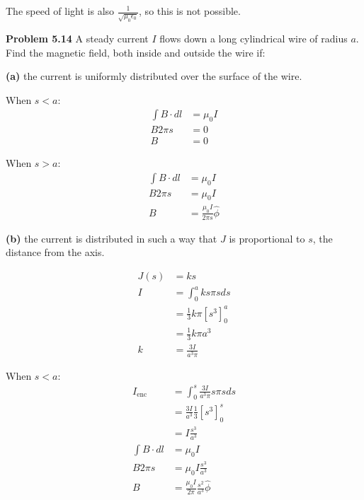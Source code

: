 \documentclass{article}
\begin{document}
The speed of light is also $\frac{1}{\sqrt{\mu_0 \epsilon_0}}$, so this is not possible. 

\textbf{Problem 5.14}
A steady current $I$ flows down a long cylindrical wire of radius $a$.
Find the magnetic field, both inside and outside the wire if:

\textbf{(a)}
the current is uniformly distributed over the surface of the wire.

When $s < a$:
\begin{equation*}
\begin{split}
	\int B \cdot dl & = \mu_0 I \\
	B 2 \pi s & = 0 \\
	B & = \boxed{0}
\end{split}
\end{equation*}

When $s > a$:
\begin{equation*}
\begin{split}
	\int B \cdot dl & = \mu_0 I \\
	B 2 \pi s & = \mu_0 I \\
	B & = \boxed{\frac{\mu_0 I}{2 \pi s} \hat{\phi}}
\end{split}
\end{equation*}

\textbf{(b)}
the current is distributed in such a way that $J$ is proportional to $s$, the distance from the axis.

\begin{equation*}
\begin{split}
	J(s) & = k s \\
	I & = \int_0^a k s \pi s ds \\
	& = \frac{1}{3} k \pi [s^3]_0^a \\
	& = \frac{1}{3} k \pi a^3 \\
	k & = \frac{3 I}{a^3 \pi}
\end{split}
\end{equation*}

When $s < a$:
\begin{equation*}
\begin{split}
	I_{\text{enc}} & = \int_0^s \frac{3 I}{a^3 \pi} s \pi s ds \\
	& = \frac{3 I}{a^3} \frac{1}{3} [s^3]_0^s \\
	& = I \frac{s^3}{a^3} \\
	\int B \cdot dl & = \mu_0 I \\
	B 2 \pi s & = \mu_0 I \frac{s^3}{a^3} \\
	B & = \boxed{\frac{\mu_0 I}{2 \pi} \frac{s^2}{a^3} \hat{\phi}}
\end{split}
\end{equation*}
\end{document}

